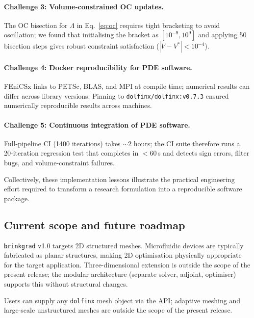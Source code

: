 \paragraph{Challenge 3: Volume-constrained OC updates.}
The OC bisection for $\Lambda$ in Eq.~\eqref{eq:oc} requires
tight bracketing to avoid oscillation; we found that initialising
the bracket as $[10^{-9},10^9]$ and applying 50 bisection steps
gives robust constraint satisfaction ($|V-V^*|<10^{-4}$).

\paragraph{Challenge 4: Docker reproducibility for PDE software.}
FEniCSx links to PETSc, BLAS, and MPI at compile time;
numerical results can differ across library versions.
Pinning to \texttt{dolfinx/dolfinx:v0.7.3} ensured
numerically reproducible results across machines.

\paragraph{Challenge 5: Continuous integration of PDE software.}
Full-pipeline CI (1400 iterations) takes $\sim$2 hours;
the CI suite therefore runs a 20-iteration regression test
that completes in $<$60\,s and detects sign errors,
filter bugs, and volume-constraint failures.


Collectively, these implementation lessons illustrate the practical engineering effort required to transform a research formulation into a reproducible software package.

\subsection{Current scope and future roadmap}
\label{sec:roadmap}
\label{sec:limitations}
\label{sec:known_limitations}
\texttt{brinkgrad} v1.0 targets 2D structured meshes.
Microfluidic devices are typically fabricated as planar structures,
making 2D optimisation physically appropriate for the target application.
Three-dimensional extension is outside the scope of the present release;
the modular architecture (separate solver, adjoint, optimiser)
supports this without structural changes.

Users can supply any \texttt{dolfinx} mesh object via the API;
adaptive meshing and large-scale unstructured meshes are outside
the scope of the present release.


